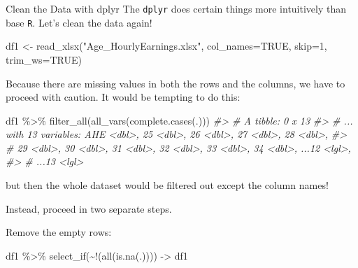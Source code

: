 \documentclass[
  11pt,
  ignorenonframetext,
  svgnames, handout, t]{beamer}
\newenvironment{Shaded}{\begin{snugshade}}{\end{snugshade}}
\newcommand{\AttributeTok}[1]{\textcolor[rgb]{0.77,0.63,0.00}{#1}}
\newcommand{\CommentTok}[1]{\textcolor[rgb]{0.56,0.35,0.01}{\textit{#1}}}
\newcommand{\ConstantTok}[1]{\textcolor[rgb]{0.00,0.00,0.00}{#1}}
\newcommand{\DecValTok}[1]{\textcolor[rgb]{0.00,0.00,0.81}{#1}}
\newcommand{\FunctionTok}[1]{\textcolor[rgb]{0.00,0.00,0.00}{#1}}
\newcommand{\NormalTok}[1]{#1}
\newcommand{\OtherTok}[1]{\textcolor[rgb]{0.56,0.35,0.01}{#1}}
\newcommand{\SpecialCharTok}[1]{\textcolor[rgb]{0.00,0.00,0.00}{#1}}
\newcommand{\StringTok}[1]{\textcolor[rgb]{0.31,0.60,0.02}{#1}}
\begin{document}
\begin{frame}[fragile]{Clean the Data \textbar{} with dplyr}
\protect\hypertarget{clean-the-data-with-dplyr}{}
The \texttt{dplyr} does certain things more intuitively than base
\texttt{R}. Let's clean the data again!

\footnotesize

\begin{Shaded}
\begin{Highlighting}[]
\NormalTok{df1 }\OtherTok{\textless{}{-}} \FunctionTok{read\_xlsx}\NormalTok{(}\StringTok{"Age\_HourlyEarnings.xlsx"}\NormalTok{, }\AttributeTok{col\_names=}\ConstantTok{TRUE}\NormalTok{, }\AttributeTok{skip=}\DecValTok{1}\NormalTok{, }\AttributeTok{trim\_ws=}\ConstantTok{TRUE}\NormalTok{)}
\end{Highlighting}
\end{Shaded}

\normalsize

Because there are missing values in both the rows and the columns, we
have to proceed with caution. It would be tempting to do this:

\footnotesize

\begin{Shaded}
\begin{Highlighting}[]
\NormalTok{df1 }\SpecialCharTok{\%\textgreater{}\%} \FunctionTok{filter\_all}\NormalTok{(}\FunctionTok{all\_vars}\NormalTok{(}\FunctionTok{complete.cases}\NormalTok{(.)))}
\CommentTok{\#\textgreater{} \# A tibble: 0 x 13}
\CommentTok{\#\textgreater{} \# ... with 13 variables: AHE \textless{}dbl\textgreater{}, 25 \textless{}dbl\textgreater{}, 26 \textless{}dbl\textgreater{}, 27 \textless{}dbl\textgreater{}, 28 \textless{}dbl\textgreater{},}
\CommentTok{\#\textgreater{} \#   29 \textless{}dbl\textgreater{}, 30 \textless{}dbl\textgreater{}, 31 \textless{}dbl\textgreater{}, 32 \textless{}dbl\textgreater{}, 33 \textless{}dbl\textgreater{}, 34 \textless{}dbl\textgreater{}, ...12 \textless{}lgl\textgreater{},}
\CommentTok{\#\textgreater{} \#   ...13 \textless{}lgl\textgreater{}}
\end{Highlighting}
\end{Shaded}

\normalsize but then the whole dataset would be filtered out except the
column names!

Instead, proceed in two separate steps.

Remove the empty rows:

\footnotesize

\begin{Shaded}
\begin{Highlighting}[]
\NormalTok{df1 }\SpecialCharTok{\%\textgreater{}\%} \FunctionTok{select\_if}\NormalTok{(}\SpecialCharTok{\textasciitilde{}!}\NormalTok{(}\FunctionTok{all}\NormalTok{(}\FunctionTok{is.na}\NormalTok{(.)))) }\OtherTok{{-}\textgreater{}}\NormalTok{ df1}
\end{Highlighting}
\end{Shaded}


\end{frame}
\end{document}
